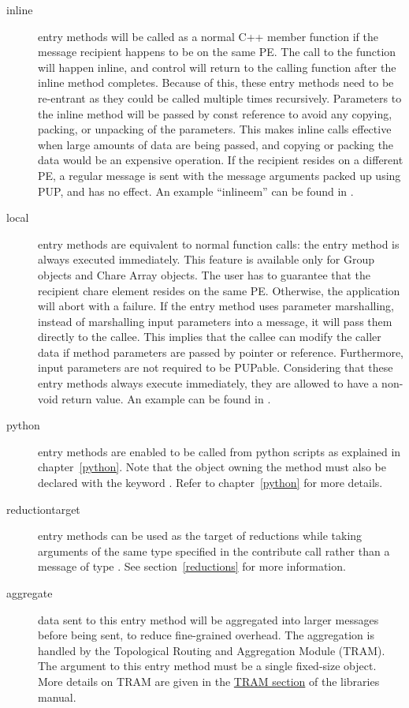 \begin{description}
\item[inline] entry methods will be called as a normal C++ member function
if the message recipient happens to be on the same PE. The call to the function
will happen inline, and control will return to the calling function after the
inline method completes. Because of this, these entry methods need to be
re-entrant as they could be called multiple times recursively. Parameters to the
inline method will be passed by const reference to avoid any copying, packing,
or unpacking of the parameters. This makes inline calls effective when large
amounts of data are being passed, and copying or packing the data would be an
expensive operation. If the recipient resides on a different PE, a regular
message is sent with the message arguments packed up using PUP, and 
has no effect. An example ``inlineem'' can be found in .

\item[local] entry methods are equivalent to normal function
calls: the entry method is always executed immediately. This feature is
available only for Group objects and Chare Array objects. The user has to
guarantee that the recipient chare element resides on the same PE. Otherwise,
the application will abort with a failure. If the  entry method uses
parameter marshalling, instead of marshalling input parameters into a message,
it will pass them directly to the callee. This implies that the callee can
modify the caller data if method parameters are passed by pointer or reference.
Furthermore, input parameters are not required to be PUPable. Considering that
these entry methods always execute immediately, they are allowed to have a
non-void return value. An example can be found in .

\item[python] entry methods are enabled to be
called from python scripts as explained in chapter~\ref{python}. Note that the object owning the method must also be declared with the
keyword . Refer to chapter~\ref{python} for more details.

\item[reductiontarget] entry methods can be
used as the target of reductions while taking arguments of the same
type specified in the contribute call rather than a message of type
. See section~\ref{reductions} for more
information.

\item[aggregate] data sent to this entry method will be
aggregated into larger messages before being sent, to reduce fine-grained
overhead. The aggregation is handled by the Topological Routing and Aggregation
Module (TRAM). The argument to this entry method must be a single fixed-size
object. More details on TRAM are given in the
\href{http://charm.cs.illinois.edu/manuals/html/libraries/manual-1p.html#TRAM}
{TRAM section} of the libraries manual.

\end{description}
